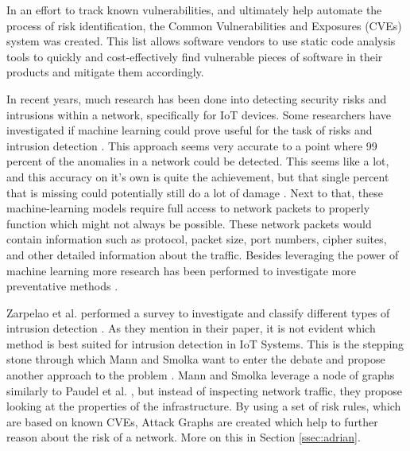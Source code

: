 In an effort to track known vulnerabilities, and ultimately help automate the process of risk identification, the Common Vulnerabilities and Exposures (CVEs) system was created. This list allows software vendors to use static code analysis tools to quickly and cost-effectively find vulnerable pieces of software in their products and mitigate them accordingly. 


In recent years, much research has been done into detecting security risks and intrusions within a network, specifically for IoT devices. Some researchers have investigated if machine learning could prove useful for the task of risks and intrusion detection \cite{canedo2016using, doshi2018machine, hamza2019detecting, sivanathan2018classifying}. This approach seems very accurate to a point where 99 percent of the anomalies in a network could be detected. This seems like a lot, and this accuracy on it's own is quite the achievement, but that single percent that is missing could potentially still do a lot of damage \cite{wei2018casino}. Next to that, these machine-learning models require full access to network packets to properly function which might not always be possible. These network packets would contain information such as protocol, packet size, port numbers, cipher suites, and other detailed information about the traffic. Besides leveraging the power of machine learning more research has been performed to investigate more preventative methods \cite{miettinen2017iot, hamza2019detecting, paudel2019detecting}.

Zarpelao et al. performed a survey to investigate and classify different types of intrusion detection \cite{zarpelao2017survey}. As they mention in their paper, it is not evident which method is best suited for intrusion detection in IoT Systems. This is the stepping stone through which Mann and Smolka want to enter the debate and propose another approach to the problem \cite{mann2023ADRIAN}. 
Mann and Smolka leverage a node of graphs similarly to Paudel et al. \cite{paudel2019detecting}, but instead of inspecting network traffic, they propose looking at the properties of the infrastructure. By using a set of risk rules, which are based on known CVEs, Attack Graphs are created which help to further reason about the risk of a network. More on this in Section \ref{ssec:adrian}.

